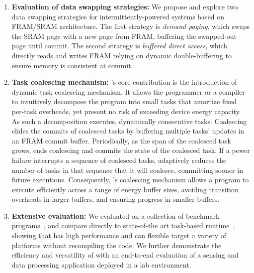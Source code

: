 \begin{enumerate}

\item {\bf Evaluation of data swapping strategies:} We propose and explore two data swapping strategies for intermittently-powered systems based on FRAM/SRAM architecture. The first strategy is {\em demand paging}, which swaps the SRAM page with a new page from FRAM, buffering the swapped-out page until commit. The second strategy is {\em buffered direct access}, which directly reads and writes FRAM relying on dynamic double-buffering to ensure memory is consistent at
commit. 


\item {\bf Task coalescing mechanism:} \sys's core contribution is the introduction of dynamic task coalescing mechanism. It allows the programmer or a compiler to intuitively decompose the program into small tasks that amortize fixed per-task overheads, yet present no risk of exceeding device energy capacity. As such a decomposition executes,  dynamically consecutive tasks. Coalescing elides the commits of coalesced tasks by buffering multiple tasks' updates in an FRAM commit buffer. Periodically, as the span of the coalesced task grows, \sys ends coalescing and commits the state of the coalesced task. If a power failure interrupts a sequence of coalesced tasks, \sys adaptively reduces the number of tasks in that sequence that it will
coalesce, committing sooner in future executions. Consequently, \sys's coalescing mechanism allows a program to execute efficiently across a range of
energy buffer sizes, avoiding transition overheads in larger buffers, and
ensuring progress in smaller buffers.


\item {\bf Extensive \sys evaluation:} We evaluated \sys on a collection of benchmark programs~\cite[Sec. 5]{chain}, and compare directly to state-of-the art task-based runtime~\cite{chain}, showing that \sys has high performance and can flexible target a variety of platforms without recompiling the code. We further demonstrate the efficiency and versatility of \sys with an end-to-end evaluation of a sensing and data processing application deployed in a lab environment. 


\end{enumerate}